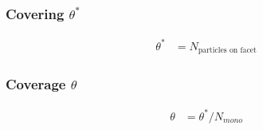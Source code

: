 \subsubsection*{Covering $\theta^*$}
\begin{equation}
	\begin{split}
		\theta^*&=N_{\text{particles on facet}}
	\end{split}
\end{equation}

\subsubsection*{Coverage $\theta$}
\begin{equation}
	\label{eq:cov}
	\begin{split}
		\theta&=\theta^*/N_{mono}
	\end{split}
\end{equation}

